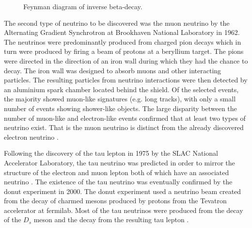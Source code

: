 \begin{figure}[h!]
\caption[Feynman diagram of inverse beta-decay.]{Feynman diagram of inverse beta-decay.}\label{fig:inverse_beta_decay_feynman}
\end{figure}


The second type of neutrino to be discovered was the muon neutrino by the Alternating Gradient Synchrotron at Brookhaven National Laboratory in 1962. The neutrinos were predominantly produced from charged pion decays which in turn were produced by firing a beam of protons at a beryllium target. The pions were directed in the direction of an iron wall during which they had the chance to decay. The iron wall was designed to absorb muons and other interacting particles. The resulting particles from neutrino interactions were then detected by an aluminium spark chamber located behind the shield. Of the selected events, the majority showed muon-like signatures (e.g. long tracks), with only a small number of events showing shower-like objects. The large disparity between the number of muon-like and electron-like events confirmed that at least two types of neutrino exist. That is the muon neutrino is distinct from the already discovered electron neutrino \cite{Muon_neutrino_discovery}. 

Following the discovery of the tau lepton in 1975 by the SLAC National Accelerator Laboratory, the tau neutrino was predicted in order to mirror the structure of the electron and muon lepton both of which have an associated neutrino \cite{tau_lepton_discovery}. The existence of the tau neutrino was eventually confirmed by the \Gls{donut} experiment in 2000. The \Gls{donut} experiment used a neutrino beam created from the decay of charmed mesons produced by protons from the  Tevatron accelerator at \gls{fermilab}. Most of the tau neutrinos were produced from the decay of the $D_s$ meson and the decay from the resulting tau lepton \cite{DONUT}.

